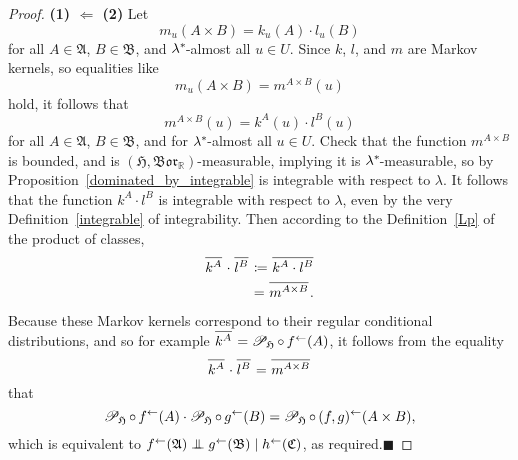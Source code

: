 \documentclass[
twoside=true,
paper=letter,
fontsize=9pt,
pagesize=auto,
leqno,
openany,
headsepline,
overfullrule,
]{scrbook}
\theoremstyle{plain}
\theoremstyle{plain}
\theoremstyle{definition}
\theoremstyle{bfnoteitalic}
\theoremstyle{bfnoteroman}
\newcommand{\sigalg}[1]{\mathfrak{#1}}
\newcommand{\cali}[1]{\mathscr{#1}}
\renewcommand{\qedsymbol}{$\blacksquare$}
\newcommand{\definedby}{\coloneqq}
\newcommand{\condprobop}[1]{\mathop{\cali{P}\hspace{-1pt}}\nolimits_{#1}}
\newcommand{\borel}{\mathfrak{Bor}}
\newcommand{\preimage}[1]{\mathop{#1^{\leftarrow}}}
\newcommand{\R}{\mathbb{R}}
\newcommand{\sigmaalgebra}{\sigalg{A}}
\newcommand{\sigmaalgebraii}{\sigalg{B}}
\newcommand{\sigmaalgebraiii}{\sigalg{C}}
\newcommand{\kernast}{\ast\kern-1pt}
\newcommand{\funcf}{f}
\newcommand{\funcg}{g}
\newcommand{\funch}{h}
\newcommand{\funck}{k}
\newcommand{\funcl}{l}
\newcommand{\funcm}{m}
\newcommand{\measlambda}{\lambda}
\newcommand{\seti}{A}
\newcommand{\setii}{B}
\newcommand{\uspace}{U}%
\newcommand{\uspaceelt}{u}
\newcommand{\condindep}[3]{#1\perp\kern-6pt\perp #2\mid #3}
\newcommand*\xbar[1]{%
   \hbox{%
     \vbox{%
       \hrule height 0.4pt %
       \kern0.4ex%
       \hbox{%
         \ensuremath{#1}%
       }%
     }%
   }%
}
\newcommand{\lebclass}[1]{\hspace{.5pt}\xbar{#1}\hspace{0.5pt}}
\newcommand{\ellclass}[2]{\lebclass{#1}^{#2}}
\begin{document}
\begin{proof}
\textbf{(1) $\Leftarrow$ (2)}\quad
Let
\[
\funcm_\uspaceelt(\seti\times\setii)
=
\funck_\uspaceelt(\seti)
\cdot
\funcl_\uspaceelt(\setii)
\]
for all $\seti\in\sigmaalgebra$, $\setii\in\sigmaalgebraii$, and
$\measlambda^\kernast$\hyp{}almost all $\uspaceelt\in\uspace$.
Since  $\funck$, $\funcl$, and $\funcm$ are Markov kernels, so equalities like
\[
\funcm_\uspaceelt(\seti\times\setii)
=
\funcm^{\seti\times\setii}(\uspaceelt)
\]
hold, it follows that
\[
\funcm^{\seti\times\setii}(\uspaceelt)
=
\funck^\seti(\uspaceelt)
\cdot
\funcl^\setii(\uspaceelt)
\]
for all $\seti\in\sigmaalgebra$, $\setii\in\sigmaalgebraii$, and
for
$\measlambda^\kernast$\hyp{}almost all $\uspaceelt\in\uspace$.
Check that the function
$\funcm^{\seti\times\setii}$
is bounded, and is
$(\sigalg{H},\borel_\R)$\hyp{}measurable, implying it is
$\measlambda^\kernast$\hyp{}measurable, so by Proposition~\ref{dominated_by_integrable}
is integrable with respect to $\measlambda$. It follows that the function
$\funck^\seti\cdot\funcl^\setii$
is integrable with respect to $\measlambda$, even by the very Definition~\ref{integrable} of integrability.
Then according to the Definition~\ref{Lp} of the product of classes,
\begin{align*}
\ellclass{\funck^\seti}{}
\cdot
\ellclass{\funcl^\setii}{}
& \definedby
\ellclass{\funck^\seti\cdot\funcl^\setii}{} \\
& =
\ellclass{\funcm^{\seti\times\setii}}{}. \\
\end{align*}
Because these Markov kernels correspond to their regular conditional distributions, and so for example
$\ellclass{\funck^\seti}{}
=
\condprobop{\sigalg{H}}\circ \preimage{\funcf}(\seti)$,
it follows from the equality
\[
\ellclass{\funck^\seti}{}
\cdot
\ellclass{\funcl^\setii}{}
=
\ellclass{\funcm^{\seti\times\setii}}{}
\]
that
\[
\condprobop{\sigalg{H}} \circ \preimage{\funcf}(\seti)
\cdot
\condprobop{\sigalg{H}} \circ \preimage{\funcg}(\setii)
=
\condprobop{\sigalg{H}} \circ \preimage{(\funcf,\funcg)}
(\seti\times\setii),
\]
which is equivalent to
$\condindep{\preimage{\funcf}(\sigmaalgebra)}{\preimage{\funcg}(\sigmaalgebraii)}
{\preimage{\funch}(\sigmaalgebraiii)}$,
as required.\hfill\qedsymbol




\end{proof}
\end{document}
